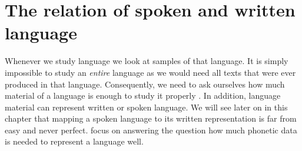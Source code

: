\label{chap:ling-background}

\section{The relation of spoken and written language}

Whenever we study language we look at samples of that language. It is simply impossible to study an \textit{entire} language as we would need all texts that were ever produced in that language. Consequently, we need to ask ourselves how much material of a language is enough to study it properly \citep{baird_evans_greenhill_2021}. In addition, language material can represent written or spoken language. We will see later on in this chapter that mapping a spoken language to its written representation is far from easy and never perfect. \citet{baird_evans_greenhill_2021} focus on answering the question how much phonetic data is needed to represent a language well. 

